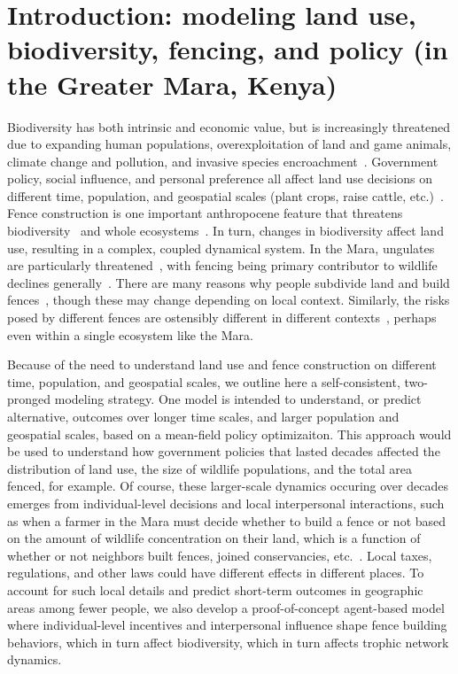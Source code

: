 \documentclass[12pt,reqno]{amsart}
\theoremstyle{mytheorem}
\theoremstyle{myremark}
\begin{document}
\section{Introduction: modeling land use, biodiversity, fencing, and policy (in the
Greater Mara, Kenya)}

Biodiversity has both intrinsic and economic value, but is increasingly threatened
due to expanding human populations, overexploitation of land and game animals,
climate change and pollution, and invasive species encroachment~\cite{Bellard2022}.
Government policy, social influence, and personal preference all affect land use
decisions on different time, population, and geospatial scales 
(plant crops, raise cattle, etc.)~\cite{Eitzel2020,Løvschal2021}.
Fence construction is one important anthropocene feature that threatens
biodiversity~\cite{Packer2013} and whole 
ecosystems~\cite{Løvschal2017,Løvschal2022}. 
In turn, changes in biodiversity affect land use, resulting in a complex, coupled
dynamical system. In the Mara, 
ungulates are particularly threatened~\cite{Ogutu2009}, with fencing being primary
contributor to wildlife declines generally~\cite{Ogutu2016}. 
There are many reasons why people subdivide land and build
fences~\cite{Mwangi2007}, though these may change depending on local context.
Similarly, the risks posed by different fences are ostensibly
different in different contexts~\cite{Bellard2022}, perhaps even within
a single ecosystem like the Mara. 

Because of the need to understand land use and
fence construction on different time, population, and geospatial scales, we
outline here a self-consistent, two-pronged modeling strategy. One 
model is intended to understand, or predict alternative, outcomes over 
longer time scales, and larger population and geospatial scales,
based on a mean-field policy optimizaiton. This approach would be used to 
understand how government policies that lasted decades affected the distribution of
land use, the size of wildlife populations, and the total area fenced, for example.
Of course, these larger-scale dynamics occuring over decades emerges from
individual-level decisions and local interpersonal interactions, such as 
when a farmer in the Mara must decide whether to build a fence or not based on
the amount of wildlife concentration on their land, which is a function of whether or
not neighbors built fences, joined conservancies, etc.~\cite{}. Local taxes,
regulations, and other laws could have different effects in different places.
To account for such local details and predict short-term outcomes in geographic areas
among fewer people, we also develop a proof-of-concept agent-based model where
individual-level incentives and interpersonal influence shape fence building
behaviors, which in turn affect biodiversity, which in turn affects trophic network
dynamics. 
\end{document}
